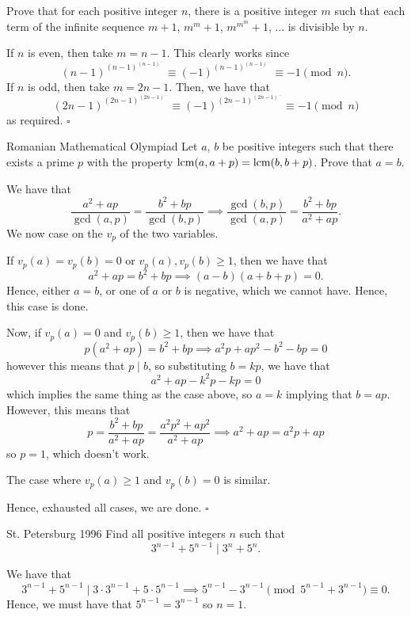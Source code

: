 \documentclass{article}
\begin{document}
\begin{problem}[1.12.5]{}
Prove that for each positive integer $n$, there is a positive integer $m$ such that each term of the infinite sequence $m + 1$, $m^m + 1$, $m^{m^m} + 1$, $\dots$ is divisible by $n$. 
\end{problem}
If $n$ is even, then take $m = n-1$. This clearly works since \[(n-1)^{(n-1)^{(n-1)^{\dots}}} \equiv (-1)^{(n-1)^{(n-1)^{\dots}}} \equiv -1 \pmod{n}.\] If $n$ is odd, then take $m = 2n-1$. Then, we have that \[(2n-1)^{(2n-1)^{(2n-1)^{\dots}}} \equiv (-1)^{(2n-1)^{(2n-1)^{\dots}}} \equiv -1 \pmod{n}\] as required. $\square$

\begin{problem}[1.12.6]{Romanian Mathematical Olympiad}
Let $a$, $b$ be positive integers such that there exists a prime $p$ with the property $\operatorname{lcm}(a, a + p) = \operatorname{lcm}(b, b + p)$. Prove that $a = b$.
\end{problem}
We have that \[\dfrac{a^2+ap}{\gcd(a, p)} = \dfrac{b^2+bp}{\gcd(b, p)} \implies \dfrac{\gcd(b, p)}{\gcd(a, p)} = \dfrac{b^2+bp}{a^2+ap}.\] We now case on the $v_p$ of the two variables.

If $v_p(a) = v_p(b) = 0$ or $v_p(a), v_p(b) \ge 1$, then we have that \[a^2+ap = b^2+bp \implies (a-b)(a+b+p) = 0.\] Hence, either $a = b$, or one of $a$ or $b$ is negative, which we cannot have. Hence, this case is done.

Now, if $v_p(a) = 0$ and $v_p(b) \ge 1$, then we have that \[p(a^2+ap) = b^2+bp \implies a^2 p + a p^2 - b^2 - b p = 0\] however this means that $p \mid b$, so substituting $b = kp$, we have that \[a^2+ap-k^2p-kp = 0\] which implies the same thing as the case above, so $a = k$ implying that $b = ap$. However, this means that \[p = \dfrac{b^2+bp}{a^2+ap} = \dfrac{a^2p^2+ap^2}{a^2+ap} \implies a^2+ap = a^2p+ap\] so $p = 1$, which doesn't work.

The case where $v_p(a) \ge 1$ and $v_p(b) = 0$ is similar.

Hence, exhausted all cases, we are done. $\square$

\begin{problem}[1.12.7]{St. Petersburg 1996}
 Find all positive integers $n$ such that \[3^{n-1} + 5^{n-1} \mid 3^n + 5^n.\]
\end{problem}
We have that \[3^{n-1}+5^{n-1} \mid 3\cdot 3^{n-1}+5\cdot 5^{n-1} \implies 5^{n-1}-3^{n-1} \pmod{5^{n-1}+3^{n-1}} \equiv 0.\] Hence, we must have that $5^{n-1} = 3^{n-1}$ so $n = \boxed{1}$.
\end{document}
